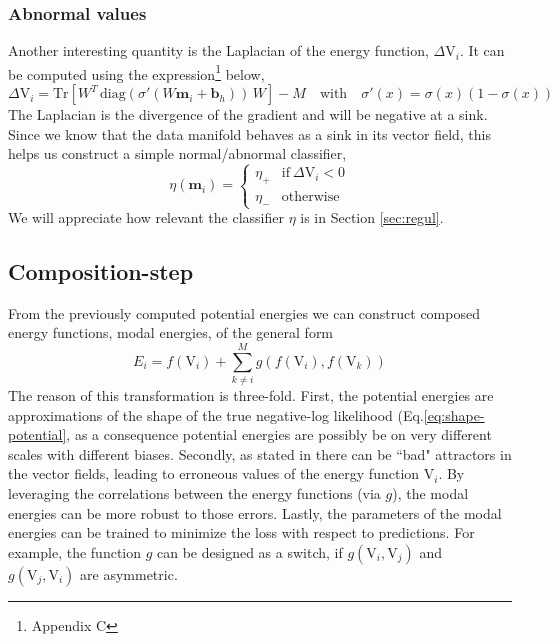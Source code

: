 \documentclass[12pt]{report}
\begin{document}
\subsubsection*{Abnormal values}
\indent Another interesting quantity is the Laplacian of the energy function, $\Delta \mathrm{V}_i$. It can be computed using the expression\footnote{Appendix C} below,
\begin{equation}
\Delta \mathrm{V}_i = \text{Tr}[W^T\,\text{diag}(\sigma'(W\textbf{m}_i + \textbf{b}_h))\,W] - M \quad \text{with} \quad \sigma'(x) = \sigma(x)(1-\sigma(x))
\end{equation}
The Laplacian is the divergence of the gradient and will be negative at a sink. Since we know that the data manifold behaves as a sink in its vector field, this helps us construct a simple normal/abnormal classifier,
\begin{equation}
\eta(\textbf{m}_i) = \begin{cases}
      \eta_+ & \text{if}\ \Delta \mathrm{V}_i < 0 \\
      \eta_- & \text{otherwise}
    \end{cases}
\end{equation}
We will appreciate how relevant the classifier $\eta$ is in Section \ref{sec:regul}.


\subsection{Composition-step}
From the previously computed potential energies we can construct composed energy functions, modal energies, of the general form
\begin{equation}
E_i = f(\mathrm{V}_i) + \sum_{k \neq i}^M g(f(\mathrm{V}_i), f(\mathrm{V}_k))
\end{equation}
The reason of this transformation is three-fold. First, the potential energies are approximations of the shape of the true negative-log likelihood (Eq.\ref{eq:shape-potential}, as a consequence potential energies are possibly be on very different scales with different biases. Secondly, as stated in \cite{alainbengio} there can be ``bad" attractors in the vector fields, leading to erroneous values of the energy function $\mathrm{V}_i$. By leveraging the correlations between the energy functions (via $g$), the modal energies can be more robust to those errors. Lastly, the parameters of the modal energies can be trained to minimize the loss with respect to predictions. For example, the function $g$ can be designed as a switch, if $g(\mathrm{V}_i, \mathrm{V}_j)$ and $g(\mathrm{V}_j, \mathrm{V}_i)$ are asymmetric.\\
\end{document}
